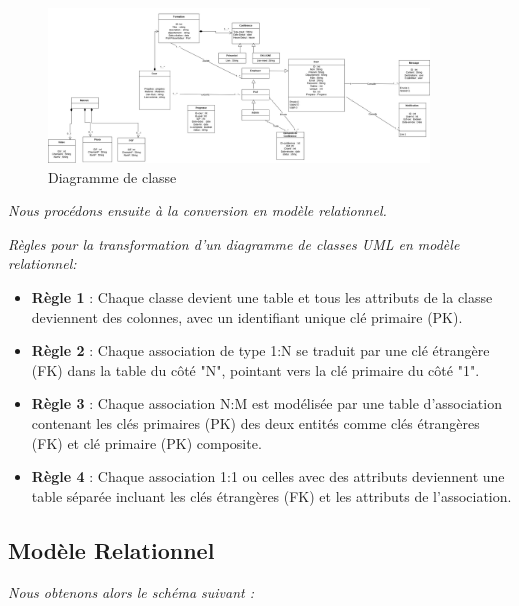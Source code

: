 \documentclass{article}
\begin{document}
\begin{figure}[H]
  \centering
  \includegraphics[width=0.9\textwidth]{classe.png}
  \caption{Diagramme de classe}
\end{figure}


\vspace{0,3cm}
\textit{Nous procédons ensuite à la conversion en modèle relationnel.}
\vspace{0.9cm}

\noindent \textit{Règles pour la transformation d’un diagramme de classes UML en modèle relationnel:}

\begin{itemize}
  \item \textbf{Règle 1} : Chaque classe devient une table et tous les attributs de la classe deviennent des colonnes, avec un identifiant unique clé primaire (PK).
  \item \textbf{Règle 2} : Chaque association de type 1:N se traduit par une clé étrangère (FK) dans la table du côté "N", pointant vers la clé primaire du côté "1".
  \item \textbf{Règle 3} : Chaque association N:M est modélisée par une table d’association contenant les clés primaires (PK) des deux entités comme clés étrangères (FK) et clé primaire (PK) composite.
  \item \textbf{Règle 4} : Chaque association 1:1 ou celles avec des attributs deviennent une table séparée incluant les clés étrangères (FK) et les attributs de l’association.
\end{itemize}


\vspace{0,3cm}

\subsection*{Modèle Relationnel}
\noindent \textit{Nous obtenons alors le schéma suivant :}
\end{document}

